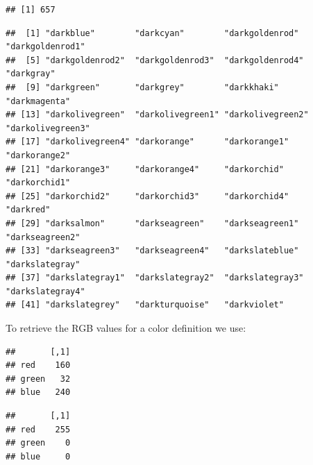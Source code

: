 \documentclass[krantz2]{krantz}\usepackage{knitr}
\begin{document}
\begin{knitrout}\footnotesize
{}\color{fgcolor}\begin{kframe}
\begin{alltt}
\hlstd{(}\hlstd{())}
\end{alltt}
\begin{verbatim}
## [1] 657
\end{verbatim}
\begin{alltt}
\hlstd{(}\hlstd{,}\hlstd{(),}  \hlstd{=} \hlstd{)}
\end{alltt}
\begin{verbatim}
##  [1] "darkblue"        "darkcyan"        "darkgoldenrod"   "darkgoldenrod1"
##  [5] "darkgoldenrod2"  "darkgoldenrod3"  "darkgoldenrod4"  "darkgray"
##  [9] "darkgreen"       "darkgrey"        "darkkhaki"       "darkmagenta"
## [13] "darkolivegreen"  "darkolivegreen1" "darkolivegreen2" "darkolivegreen3"
## [17] "darkolivegreen4" "darkorange"      "darkorange1"     "darkorange2"
## [21] "darkorange3"     "darkorange4"     "darkorchid"      "darkorchid1"
## [25] "darkorchid2"     "darkorchid3"     "darkorchid4"     "darkred"
## [29] "darksalmon"      "darkseagreen"    "darkseagreen1"   "darkseagreen2"
## [33] "darkseagreen3"   "darkseagreen4"   "darkslateblue"   "darkslategray"
## [37] "darkslategray1"  "darkslategray2"  "darkslategray3"  "darkslategray4"
## [41] "darkslategrey"   "darkturquoise"   "darkviolet"
\end{verbatim}
\end{kframe}
\end{knitrout}

To retrieve the RGB values for a color definition we use:

\begin{knitrout}\footnotesize
{}\color{fgcolor}\begin{kframe}
\begin{alltt}
\hlstd{(}\hlstd{)}
\end{alltt}
\begin{verbatim}
##       [,1]
## red    160
## green   32
## blue   240
\end{verbatim}
\begin{alltt}
\hlstd{(}\hlstd{)}
\end{alltt}
\begin{verbatim}
##       [,1]
## red    255
## green    0
## blue     0
\end{verbatim}
\end{kframe}
\end{knitrout}
\end{document}
